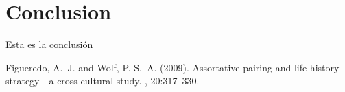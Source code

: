 \documentclass[12pt, spanish]{article}
\begin{document}

    \section{Conclusion}

    Esta es la conclusión


    \begin{thebibliography}{99}

        Figueredo, A.~J. and Wolf, P. S.~A. (2009).
        \newblock Assortative pairing and life history strategy - a cross-cultural
          study.
        , 20:317--330.
         
    \end{thebibliography}

\end{document}

